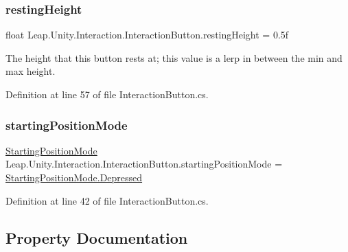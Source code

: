 \subsubsection{\texorpdfstring{restingHeight}{restingHeight}}
{\footnotesize\ttfamily float Leap.\+Unity.\+Interaction.\+Interaction\+Button.\+resting\+Height = 0.\+5f}



The height that this button rests at; this value is a lerp in between the min and max height. 



Definition at line 57 of file Interaction\+Button.\+cs.

\mbox{\label{class_leap_1_1_unity_1_1_interaction_1_1_interaction_button_a48c30245b6b71691985f9b4423c8ce59}} 
\subsubsection{\texorpdfstring{startingPositionMode}{startingPositionMode}}
{\footnotesize\ttfamily \mbox{\hyperlink{class_leap_1_1_unity_1_1_interaction_1_1_interaction_button_a29761e33189cdf8131bb519cdc114fd2}{Starting\+Position\+Mode}} Leap.\+Unity.\+Interaction.\+Interaction\+Button.\+starting\+Position\+Mode = \mbox{\hyperlink{class_leap_1_1_unity_1_1_interaction_1_1_interaction_button_a29761e33189cdf8131bb519cdc114fd2a83cd8cb2be2d9278f796db9daf0e61eb}{Starting\+Position\+Mode.\+Depressed}}}



Definition at line 42 of file Interaction\+Button.\+cs.



\subsection{Property Documentation}
\mbox{\label{class_leap_1_1_unity_1_1_interaction_1_1_interaction_button_ad25616c2095b92d6abf00c501fead38f}} 
